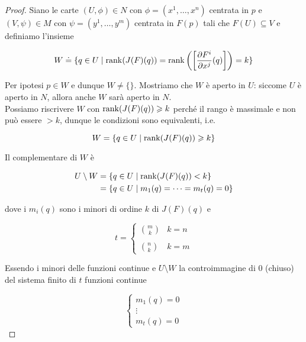 \begin{proof}
	Siano le carte $ (U,\phi) \in N $ con $ \phi = (x^{1},\dots,x^{n}) $ centrata in $ p $ e $ (V,\psi) \in M $ con $ \psi = (y^{1},\dots,y^{m}) $ centrata in $ F(p) $ tali che $ F(U) \subseteq V $ e definiamo l'insieme
	
	\begin{equation}
		W \doteq \{ q \in U \mid \rank(J(F)(q)) = \rank \left( \left[ \dfrac{\partial F^{i}}{\partial x^{j}} (q) \right] \right) = k \}
	\end{equation}

	Per ipotesi $ p \in W $ e dunque $ W \neq \{\} $. Mostriamo che $ W $ è aperto in $ U $: siccome $ U $ è aperto in $ N $, allora anche $ W $ sarà aperto in $ N $.\\
	Possiamo riscrivere $ W $ con $ \rank(J(F)(q)) \geqslant k $ perché il rango è massimale e non può essere $ >k $, dunque le condizioni sono equivalenti, i.e.
	
	\begin{equation}
		W = \{ q \in U \mid \rank(J(F)(q)) \geqslant k \}
	\end{equation}

	Il complementare di $ W $ è
	
	\begin{align}
		\begin{split}
			U \setminus W &= \{ q \in U \mid \rank(J(F)(q)) < k \}\\
			&= \{ q \in U \mid m_{1}(q) = \cdots = m_{t}(q) = 0 \}
		\end{split}
	\end{align}

	dove i $ m_{i}(q) $ sono i minori di ordine $ k $ di $ J(F)(q) $ e
	
	\begin{equation}
		t =%
			\begin{cases}
				\binom{m}{k} & k = n\\\\
				\binom{n}{k} & k = m
			\end{cases}
	\end{equation}

	Essendo i minori delle funzioni continue e $ U \setminus W $ la controimmagine di 0 (chiuso) del sistema finito di $ t $ funzioni continue
	
	\begin{equation}
		\begin{cases}
			m_{1}(q) = 0\\
			\vdots\\
			m_{t}(q) = 0
		\end{cases}
	\end{equation}


\end{proof}
